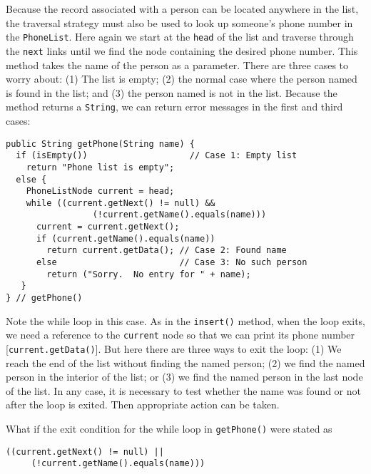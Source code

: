 \noindent Because the record associated with a person can be located
anywhere in the list, the traversal strategy must also be used to look
up someone's phone number in the {\tt PhoneList}. Here again we start
at the {\tt head} of the list and traverse through the {\tt next} links
until we find the node containing the desired phone number.  This
method takes the name of the person as a parameter.  There are three
cases to worry about: (1) The list is empty; (2) the normal case where
the person named is found in the list; and (3) the person named is not
in the list.  Because the method returns a {\tt String}, we can return
error messages in the first and third cases:

\begin{jjjlisting}
\begin{lstlisting}
public String getPhone(String name) {
  if (isEmpty())                    // Case 1: Empty list
    return "Phone list is empty";
  else {
    PhoneListNode current = head;
    while ((current.getNext() != null) &&
                 (!current.getName().equals(name)))
      current = current.getNext();
      if (current.getName().equals(name))
        return current.getData(); // Case 2: Found name
      else                        // Case 3: No such person
        return ("Sorry.  No entry for " + name);
   }
} // getPhone()
\end{lstlisting}
\end{jjjlisting}

\noindent Note the while loop in this case.   As in the {\tt insert()}
method, when the loop exits, we need a reference to the {\tt current}
node so that we can print its phone number [{\tt current.getData()}].  But
here there are three ways to exit the loop: (1) We reach the end of
the list without finding the named person; (2) we find the named
person in the interior of the list; or (3) we find the named person
in the last node of the list.  In any case, it is necessary to test
whether the name was found or not after the loop is exited.  Then
appropriate action can be taken.

\begin{SSTUDY}

\item  What if the exit condition for the while loop
in {\tt getPhone()} were stated as
\begin{jjjlisting}
\begin{lstlisting}
((current.getNext() != null) ||
     (!current.getName().equals(name)))
\end{lstlisting}
\end{jjjlisting}
\end{SSTUDY}

